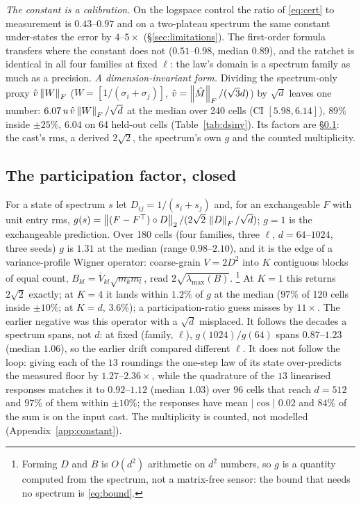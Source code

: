 \emph{The constant is a calibration.}  On the logspace control the ratio of \eqref{eq:cert}
to measurement is $0.43$--$0.97$ and on a two-plateau spectrum the same constant
under-states the error by $4$--$5\times$ (\S\ref{sec:limitations}).  The first-order formula transfers where the
constant does not ($0.51$--$0.98$, median $0.89$), and the ratchet is identical in all four
families at fixed $\ell$: the law's domain is a spectrum family as much as a precision.
\emph{A dimension-invariant form.}  Dividing the spectrum-only proxy
$\hat v\left\lVert W \right\rVert_F$ ($W=[1/(\sigma_i+\sigma_j)]$, $\hat v=\left\lVert \hat M \right\rVert_F/(\sqrt3 d)$) by
$\sqrt d$ leaves one number: $6.07\,u\,\hat v\left\lVert W \right\rVert_F/\sqrt d$ at the median over 240
cells (CI $[5.98,6.14]$), $89\%$ inside $\pm25\%$, $6.04$ on 64 held-out cells
(Table~\ref{tab:dsinv}).  Its factors are \S\ref{sec:profile}: the cast's rms, a derived
$2\sqrt2$, the spectrum's own $g$ and the counted multiplicity.

\subsection{The participation factor, closed}
\label{sec:profile}

For a state of spectrum $s$ let $D_{ij}=1/(s_i+s_j)$ and, for an exchangeable $F$ with
unit entry rms, $g(s)=\left\lVert (F-F^\top)\circ D \right\rVert_2/(2\sqrt2\,\left\lVert D \right\rVert_F/\sqrt d)$; $g=1$ is
the exchangeable prediction.  Over 180 cells (four families, three $\ell$,
$d=64$--$1024$, three seeds) $g$ is $1.31$ at the median (range $0.98$--$2.10$), and it is
the edge of a variance-profile Wigner operator: coarse-grain $V=2D^2$ into $K$ contiguous
blocks of equal count, $B_{kl}=\overline{V}_{kl}\sqrt{m_km_l}$, read
$2\sqrt{\lambda_{\max}(B)}$.
\footnote{Forming $D$ and $B$ is $O(d^2)$ arithmetic on $d^2$ numbers, so $g$ is a
quantity computed from the spectrum, not a matrix-free sensor: the bound that needs no
spectrum is \eqref{eq:bound}.}
At $K=1$ this returns $2\sqrt2$ exactly; at $K=4$ it lands
within $1.2\%$ of $g$ at the median ($97\%$ of 120 cells inside $\pm10\%$; at
$K=d$, $3.6\%$); a participation-ratio guess misses by $11\times$.  The earlier negative
was this operator with a $\sqrt d$ misplaced.  It follows the decades a spectrum spans,
not $d$: at fixed (family, $\ell$), $g(1024)/g(64)$ spans $0.87$--$1.23$ (median $1.06$),
so the earlier drift compared different $\ell$.  It does not follow the loop: giving each
of the $13$ roundings the one-step law of its state over-predicts the measured floor by
$1.27$--$2.36\times$, while the quadrature of the $13$ linearised responses matches it to $0.92$--$1.12$ (median $1.03$) over 96 cells that
reach $d=512$ and $97\%$ of them within $\pm10\%$; the responses have mean $|\cos|$ $0.02$
and $84\%$ of the sum is on the input cast.  The multiplicity is counted, not modelled
(Appendix~\ref{app:constant}).

